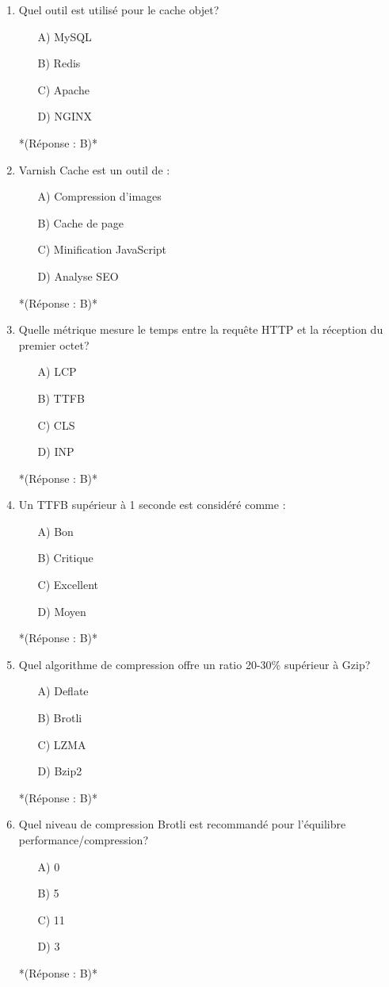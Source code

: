 \documentclass[12pt,a4paper,twoside]{report}
\begin{document}
\begin{enumerate}
\item Quel outil est utilisé pour le cache objet?
\begin{itemize}
\item[A)] MySQL
\item[B)] Redis
\item[C)] Apache
\item[D)] NGINX
\end{itemize}
*(Réponse : B)*

\item Varnish Cache est un outil de :
\begin{itemize}
\item[A)] Compression d'images
\item[B)] Cache de page
\item[C)] Minification JavaScript
\item[D)] Analyse SEO
\end{itemize}
*(Réponse : B)*

\item Quelle métrique mesure le temps entre la requête HTTP et la réception du premier octet?
\begin{itemize}
\item[A)] LCP
\item[B)] TTFB
\item[C)] CLS
\item[D)] INP
\end{itemize}
*(Réponse : B)*

\item Un TTFB supérieur à 1 seconde est considéré comme :
\begin{itemize}
\item[A)] Bon
\item[B)] Critique
\item[C)] Excellent
\item[D)] Moyen
\end{itemize}
*(Réponse : B)*

\item Quel algorithme de compression offre un ratio 20-30\% supérieur à Gzip?
\begin{itemize}
\item[A)] Deflate
\item[B)] Brotli
\item[C)] LZMA
\item[D)] Bzip2
\end{itemize}
*(Réponse : B)*

\item Quel niveau de compression Brotli est recommandé pour l'équilibre performance/compression?
\begin{itemize}
\item[A)] 0
\item[B)] 5
\item[C)] 11
\item[D)] 3
\end{itemize}
*(Réponse : B)*


\end{enumerate}
\end{document}
